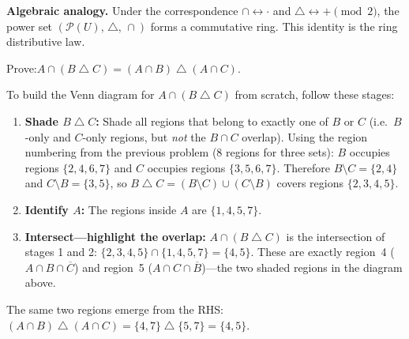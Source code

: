 \documentclass[12pt, a4paper]{article}
\newcommand{\comp}[1]{\overline{#1}}
\newcommand{\symdiff}{\mathbin{\triangle}}
\begin{document}
\begin{theorybox}
\begin{center}
\end{center}

\medskip
\textbf{Algebraic analogy.}\;
Under the correspondence $\cap \leftrightarrow \cdot$ and
$\symdiff \leftrightarrow +\!\pmod{2}$,
the power set $(\mathcal{P}(U),\,\symdiff,\,\cap)$ forms a
commutative ring. This identity is the ring distributive law.
\end{theorybox}

\begin{problembox}
Prove:\quad $A \cap (B \symdiff C) = (A \cap B) \symdiff (A \cap C)$.
\end{problembox}

\begin{tcolorbox}[colback=gray!3, colframe=gray!60, arc=2mm, left=5pt, right=5pt, top=5pt, bottom=5pt, title={\small Intermediate Shading Steps --- Building the Venn Diagram}]
To build the Venn diagram for $A \cap (B \symdiff C)$ from scratch, follow these stages:

\begin{enumerate}[label=\textbf{Stage \arabic*:}, leftmargin=*, nosep, itemsep=4pt]
  \item \textbf{Shade $B \symdiff C$:}\;
        Shade all regions that belong to exactly one of $B$ or $C$
        (i.e.\ $B$-only and $C$-only regions, but \emph{not} the $B \cap C$ overlap).
      Using the region numbering from the previous problem (8 regions for three sets):
      $B$ occupies regions $\{2,4,6,7\}$ and $C$ occupies regions $\{3,5,6,7\}$.
      Therefore $B\setminus C = \{2,4\}$ and $C\setminus B = \{3,5\}$, so
      $B \symdiff C = (B\setminus C) \cup (C\setminus B)$ covers regions $\{2,3,4,5\}$.

  \item \textbf{Identify $A$:}\;
        The regions inside $A$ are $\{1, 4, 5, 7\}$.

  \item \textbf{Intersect---highlight the overlap:}\;
        $A \cap (B \symdiff C)$ is the intersection of stages 1 and 2:
        $\{2, 3, 4, 5\} \cap \{1, 4, 5, 7\} = \{4, 5\}$.
        These are exactly region~4 ($A \cap B \cap \comp{C}$) and
        region~5 ($A \cap C \cap \comp{B}$)---the two shaded regions in the
        diagram above.
\end{enumerate}

The same two regions emerge from the RHS: $(A \cap B) \symdiff (A \cap C) = \{4, 7\} \symdiff \{5, 7\} = \{4, 5\}$.
\end{tcolorbox}
\end{document}
